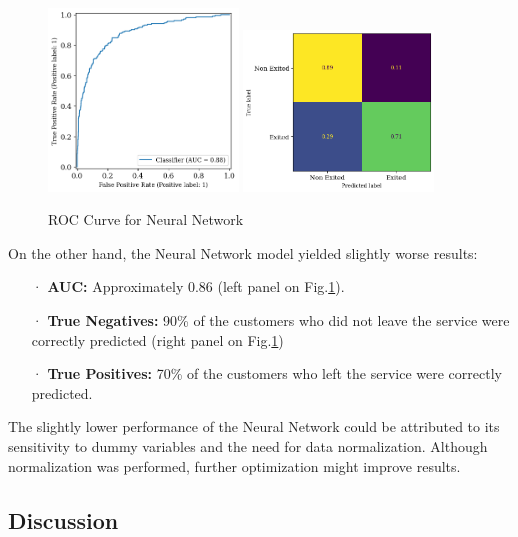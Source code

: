 \documentclass[12pt]{article}
\begin{document}
\begin{figure}[h!]
    \centering
    \includegraphics[width=0.45\textwidth]{figures/roc_curve_nn.png}
    \includegraphics[width=0.45\textwidth]{figures/confusion_matrix_nn.png}
    \caption{ROC Curve for Neural Network}
    \label{fig:roc_curve_nn}
\end{figure}

On the other hand, the Neural Network model yielded slightly worse results:
\begin{itemize}
    \item[·] \textbf{AUC:} Approximately 0.86 (left panel on Fig.\ref{fig:roc_curve_nn}).
    \item[·] \textbf{True Negatives:} 90\% of the customers who did not leave the service were correctly predicted (right panel on Fig.\ref{fig:roc_curve_nn})
    \item[·] \textbf{True Positives:} 70\% of the customers who left the service were correctly predicted.
\end{itemize}

The slightly lower performance of the Neural Network could be attributed to its sensitivity to dummy variables and the need for data normalization. Although normalization was performed, further optimization might improve results.

\subsection{Discussion}
\end{document}
